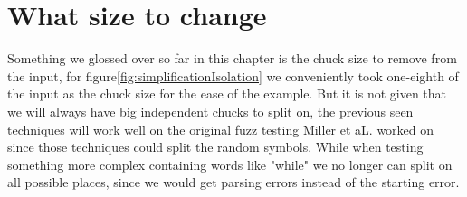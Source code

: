 \section{What size to change}
Something we glossed over so far in this chapter is the chuck size to remove from the input, for figure\ref{fig:simplificationIsolation} we conveniently took one-eighth of the input as the chuck size for the ease of the example. But it is not given that we will always have big independent chucks to split on, the previous seen techniques will work well on the original fuzz testing Miller et aL.\cite{4originalFuzzingUnixUtils} worked on since those techniques could split the random symbols. While when testing something more complex containing words like "while" we no longer can split on all possible places, since we would get parsing errors instead of the starting error.






%


